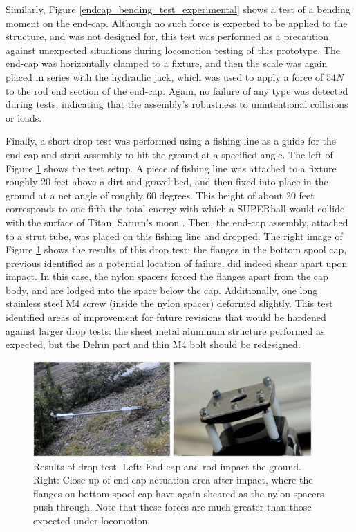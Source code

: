 \documentclass[12pt]{report}
\begin{document}
Similarly, Figure \ref{endcap_bending_test_experimental} shows a test of a bending moment on the end-cap.
Although no such force is expected to be applied to the structure, and was not designed for, this test was performed as a precaution against unexpected situations during locomotion testing of this prototype.
The end-cap was horizontally clamped to a fixture, and then the scale was again placed in series with the hydraulic jack, which was used to apply a force of $54 N$ to the rod end section of the end-cap.
Again, no failure of any type was detected during tests, indicating that the assembly's robustness to unintentional collisions or loads.

Finally, a short drop test was performed using a fishing line as a guide for the end-cap and strut assembly to hit the ground at a specified angle.
The left of Figure \ref{endcap_drop_test_results} shows the test setup.
A piece of fishing line was attached to a fixture roughly 20 feet above a dirt and gravel bed, and then fixed into place in the ground at a net angle of roughly 60 degrees.
This height of about 20 feet corresponds to one-fifth the total energy with which a SUPERball would collide with the surface of Titan, Saturn's moon \cite{Vytas_IPPW_2013}.
Then, the end-cap assembly, attached to a strut tube, was placed on this fishing line and dropped.
The right image of Figure \ref{endcap_drop_test_results} shows the results of this drop test: the flanges in the bottom spool cap, previous identified as a potential location of failure, did indeed shear apart upon impact.
In this case, the nylon spacers forced the flanges apart from the cap body, and are lodged into the space below the cap.
Additionally, one long stainless steel M4 screw (inside the nylon spacer) deformed slightly.
This test identified areas of improvement for future revisions that would be hardened against larger drop tests: the sheet metal aluminum structure performed as expected, but the Delrin part and thin M4 bolt should be redesigned.

\begin{figure}[hbt]
  \begin{center}
    \includegraphics[width=0.95\textwidth]{./img/drop_test_results.jpg}
    \caption{Results of drop test. Left: End-cap and rod impact the ground. Right: Close-up of end-cap actuation area after impact, where the flanges on bottom spool cap have again sheared as the nylon spacers push through. Note that these forces are much greater than those expected under locomotion.}
    \label{endcap_drop_test_results}
  \end{center}
\end{figure}
\end{document}
